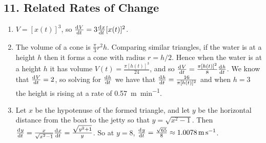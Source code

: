 \subsection*{11. Related Rates of Change}
\begin{enumerate}
  \item $ V = [x(t)]^3 $, so $ \od{V}{t} = 3\od{x}{t} [x(t)]^2 $.
  \item The volume of a cone is $ \frac{\pi}{3}r^2 h $. Comparing similar triangles, if the water is at a height $ h $ then it forms a cone
        with radius $ r = h/2 $. Hence when the water is at a height $ h $ it has volume $ V(t) = \frac{\pi [h(t)]^3}{24} $, and
        so $ \od{V}{t} = \frac{\pi [h(t)]^2}{8} \od{h}{t} $. We know that $ \od{V}{t} = 2 $, so solving for $ \od{h}{t} $ we have
        that $ \od{h}{t} = \frac{16}{\pi [h(t)]^2} $ and when $ h = 3 $ the height is rising at a rate of \SI{0.57}{\metre\per\minute}.
  \item Let $ x $ be the hypotenuse of the formed triangle, and let $ y $ be the horizontal distance from the boat to the jetty
        so that $ y = \sqrt{x^2 - 1} $. Then $ \od{y}{t} = \frac{x}{\sqrt{x^2 - 1}} \od{x}{t} = \frac{\sqrt{y^2 + 1}}{y} $. So
        at $ y = 8 $, $ \od{y}{t} = \frac{\sqrt{65}}{8} \approx \SI{1.0078}{\metre\per\second} $.
\end{enumerate}

